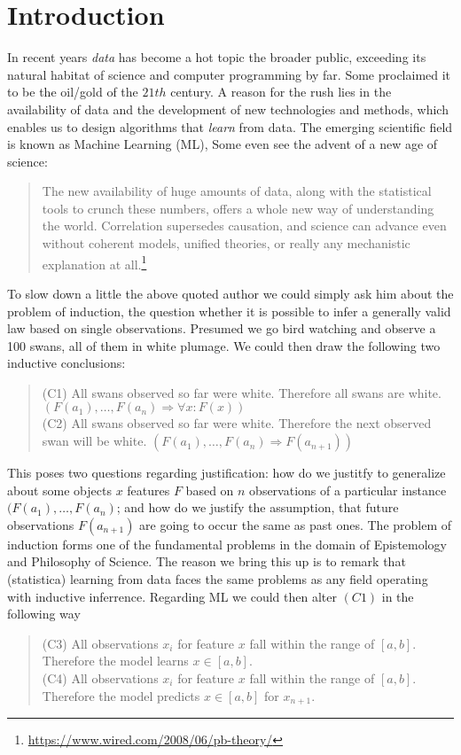 \section{Introduction}\label{Sec:intro}


In recent years \textit{data} has become a hot topic  the broader public, exceeding its natural habitat of science and computer programming by far. Some proclaimed it to be the oil/gold of the $21{th}$ century. A reason for the rush lies in the availability of data and the development of new technologies and methods, which enables us to design algorithms that \textit{learn} from data. The emerging scientific field is known as Machine Learning (ML), Some even see the advent of a new age of science:
\begin{quote}
	The new availability of huge amounts of data, along with the statistical tools to crunch these numbers, offers a whole new way of understanding the world. Correlation supersedes causation, and science can advance even without coherent models, unified theories, or really any mechanistic explanation at all.\footnote{\url{https://www.wired.com/2008/06/pb-theory/}}
\end{quote}
To slow down a little the above quoted author we could simply ask him about the problem of induction, the question whether it is possible to infer a generally valid law based on single observations. Presumed we go bird watching and observe a 100 swans, all of them in white plumage. We could then draw the following two inductive conclusions:	
\begin{quote}
	(C1) All swans observed so far were white. Therefore all swans are white. $(F(a_1),\dots,F(a_n) \Rightarrow \forall x: F(x))$ \\
	(C2) All swans observed so far were white. Therefore the next observed swan will be white. $(F(a_1),\dots,F(a_n) \Rightarrow F(a_{n+1}))$
\end{quote} 
This poses two questions regarding justification: how do we justitfy to generalize about some objects $x$ features $F$ based on $n$ observations of a particular instance $(F(a_1),\dots,F(a_n) $; and how do we justify the assumption, that future observations $F(a_{n+1})$ are going to occur the same as past ones. The problem of induction forms one of the fundamental problems in the domain of Epistemology and Philosophy of Science. The reason we bring this up\kom{,} is to remark that (statistica) learning from data faces the same problems  as any field operating with inductive inferrence. Regarding ML we could then alter $(C1)$ in the following way\begin{quote}
	(C3) All observations $x_i$ for feature $x$ fall within the range of $[a,b]$. Therefore the model learns $x \in [a,b]$. \\
	(C4) All observations $x_i$ for feature $x$ fall within the range of $[a,b]$. Therefore the model predicts $x \in [a,b]$ for $x_{n+1}$.
\end{quote} 
